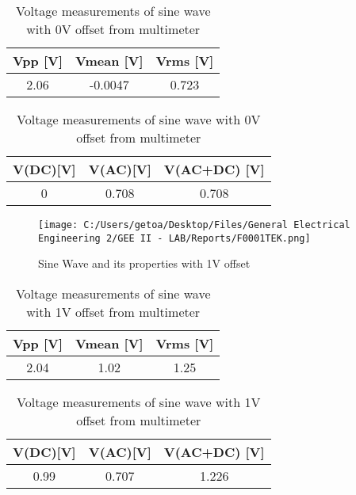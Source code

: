 \documentclass[12pt]{report}
\begin{document}
\begin{table}[ht]
\centering
\begin{minipage}{0.8\linewidth}
\centering
\begin{tabular}{|c|c|c|}
\hline
\rowcolor{lightblue} Vpp [V] & Vmean [V] & Vrms [V] \\
\hline
2.06 & -0.0047 & 0.723 \\
\hline
\end{tabular}
\caption{Voltage measurements of sine wave with 0V offset from oscilloscope\\}
\label{tab:voltage1} 
\end{minipage}
\hfill
\begin{minipage}{0.8\linewidth}
\centering
\begin{tabular}{|c|c|c|}
\hline
\rowcolor{lightblue} V(DC)[V] & V(AC)[V] & V(AC+DC) [V] \\
\hline
0 & 0.708 & 0.708 \\
\hline
\end{tabular}
\caption{Voltage measurements of sine wave with 0V offset from multimeter}
\label{tab:voltage2a}
\end{minipage}
\end{table}

\begin{figure}[ht]
  \centering
  \texttt{[image: C:/Users/getoa/Desktop/Files/General Electrical Engineering 2/GEE II - LAB/Reports/F0001TEK.png]}
  \caption{Sine Wave and its properties with 1V offset}
\end{figure} 

\begin{table}[ht]
\centering
\begin{minipage}{0.8\linewidth}
\centering
\begin{tabular}{|c|c|c|}
\hline
\rowcolor{lightblue} Vpp [V] & Vmean [V] & Vrms [V] \\
\hline
2.04 & 1.02 & 1.25 \\
\hline
\end{tabular}
\caption{Voltage measurements of sine wave with 1V offset from oscilloscope \\}
\label{tab:voltage1b} 
\end{minipage}
\hfill
\begin{minipage}{0.8\linewidth}
\centering
\begin{tabular}{|c|c|c|}
\hline
\rowcolor{lightblue} V(DC)[V] & V(AC)[V] & V(AC+DC) [V] \\
\hline
0.99 & 0.707 & 1.226 \\
\hline
\end{tabular}
\caption{Voltage measurements of sine wave with 1V offset from multimeter}
\end{minipage}
\end{table}
\FloatBarrier %
\end{document}
